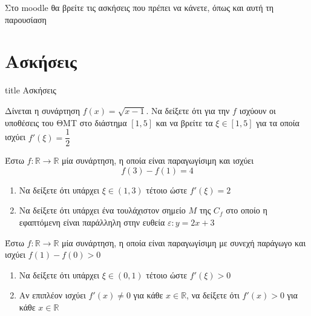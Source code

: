 \documentclass{presentation}
\begin{document}
\begin{frame}
  Στο moodle θα βρείτε τις ασκήσεις που πρέπει να κάνετε, όπως και αυτή τη παρουσίαση
\end{frame}

\section{Ασκήσεις}

\begin{frame}[noframenumbering]
  \vfill
  \centering
  \begin{beamercolorbox}[sep=8pt,center,shadow=true,rounded=true]{title}
    Ασκήσεις
  \end{beamercolorbox}
  \vfill
\end{frame}

\begin{askisi}
  Δίνεται η συνάρτηση $f(x)=\sqrt{x-1}$. Να δείξετε ότι για την $f$ ισχύουν οι υποθέσεις του ΘΜΤ στο διάστημα $[1,5]$ και να βρείτε τα $ξ\in [1,5]$ για τα οποία ισχύει $f'(ξ)=\dfrac{1}{2}$

\end{askisi}

\begin{askisi}
  Έστω $f:\mathbb{R}\to\mathbb{R}$ μία συνάρτηση, η οποία είναι παραγωγίσιμη και ισχύει
  $$f(3)-f(1)=4$$
  \begin{enumerate}
    \item<1-> Να δείξετε ότι υπάρχει $ξ\in (1,3)$ τέτοιο ώστε $f'(ξ)=2$
    \item<2-> Να δείξετε ότι υπάρχει ένα τουλάχιστον σημείο $Μ$ της $C_f$ στο οποίο η εφαπτόμενη είναι παράλληλη στην ευθεία $ε:y=2x+3$
  \end{enumerate}

\end{askisi}

\begin{askisi}
  Έστω $f:\mathbb{R}\to\mathbb{R}$ μία συνάρτηση, η οποία είναι παραγωγίσιμη με συνεχή παράγωγο και ισχύει $f(1)-f(0)>0$
  \begin{enumerate}
    \item<1-> Να δείξετε ότι υπάρχει $ξ\in (0,1)$ τέτοιο ώστε $f'(ξ)>0$
    \item<2-> Αν επιπλέον ισχύει $f'(x)\ne 0$ για κάθε $x\in\mathbb{R}$, να δείξετε ότι $f'(x)>0$ για κάθε $x\in\mathbb{R}$
  \end{enumerate}

\end{askisi}
\end{document}

